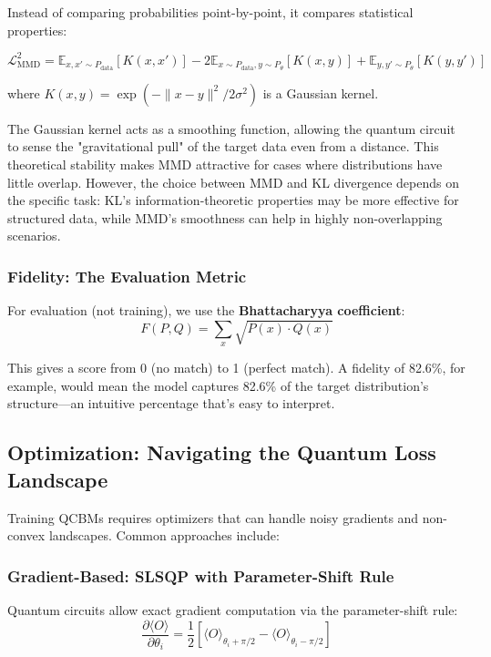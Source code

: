 \documentclass[11pt,a4paper]{article}
\begin{document}
Instead of comparing probabilities point-by-point, it compares statistical properties:

\begin{equation}
    \mathcal{L}_{\text{MMD}}^2 = \mathbb{E}_{x,x' \sim P_{\text{data}}}[K(x,x')] - 2\mathbb{E}_{x \sim P_{\text{data}}, y \sim P_\theta}[K(x,y)] + \mathbb{E}_{y,y' \sim P_\theta}[K(y,y')]
\end{equation}

where $K(x, y) = \exp(-\|x - y\|^2 / 2\sigma^2)$ is a Gaussian kernel.

The Gaussian kernel acts as a smoothing function, allowing the quantum circuit to sense the "gravitational pull" of the target data even from a distance. This theoretical stability makes MMD attractive for cases where distributions have little overlap. However, the choice between MMD and KL divergence depends on the specific task: KL's information-theoretic properties may be more effective for structured data, while MMD's smoothness can help in highly non-overlapping scenarios.
\subsubsection{Fidelity: The Evaluation Metric}

For evaluation (not training), we use the \textbf{Bhattacharyya coefficient}:
\[
F(P, Q) = \sum_{x} \sqrt{P(x) \cdot Q(x)}
\]

This gives a score from 0 (no match) to 1 (perfect match). A fidelity of 82.6\%, for example, would mean the model captures 82.6\% of the target distribution's structure—an intuitive percentage that's easy to interpret.

\subsection{Optimization: Navigating the Quantum Loss Landscape}

Training QCBMs requires optimizers that can handle noisy gradients and non-convex landscapes. Common approaches include:

\subsubsection{Gradient-Based: SLSQP with Parameter-Shift Rule}

Quantum circuits allow exact gradient computation via the parameter-shift rule:
\[
\frac{\partial \langle O \rangle}{\partial \theta_i} = \frac{1}{2}\left[ \langle O \rangle_{\theta_i + \pi/2} - \langle O \rangle_{\theta_i - \pi/2} \right]
\]
\end{document}
